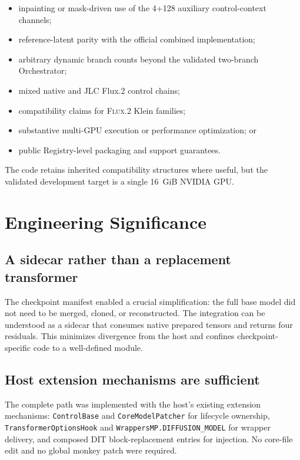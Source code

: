 \documentclass[11pt]{article}
\newcommand{\FluxTwo}{\textsc{Flux.2}}
\newcommand{\JLC}{\textsc{JLC}}
\newcommand{\code}[1]{\texttt{#1}}
\begin{document}
\begin{itemize}
  \item inpainting or mask-driven use of the 4+128 auxiliary control-context channels;
  \item reference-latent parity with the official combined implementation;
  \item arbitrary dynamic branch counts beyond the validated two-branch Orchestrator;
  \item mixed native and \JLC{} Flux.2 control chains;
  \item compatibility claims for \FluxTwo{} Klein families;
  \item substantive multi-GPU execution or performance optimization; or
  \item public Registry-level packaging and support guarantees.
\end{itemize}

The code retains inherited compatibility structures where useful, but the validated development target is a single 16~GiB NVIDIA GPU.

\section{Engineering Significance}

\subsection{A sidecar rather than a replacement transformer}

The checkpoint manifest enabled a crucial simplification: the full base model did not need to be merged, cloned, or reconstructed. The integration can be understood as a sidecar that consumes native prepared tensors and returns four residuals. This minimizes divergence from the host and confines checkpoint-specific code to a well-defined module.

\subsection{Host extension mechanisms are sufficient}

The complete path was implemented with the host's existing extension mechanisms: \code{ControlBase} and \code{CoreModelPatcher} for lifecycle ownership, \code{TransformerOptionsHook} and \code{WrappersMP.DIFFUSION\_MODEL} for wrapper delivery, and composed DIT block-replacement entries for injection. No core-file edit and no global monkey patch were required.
\end{document}
